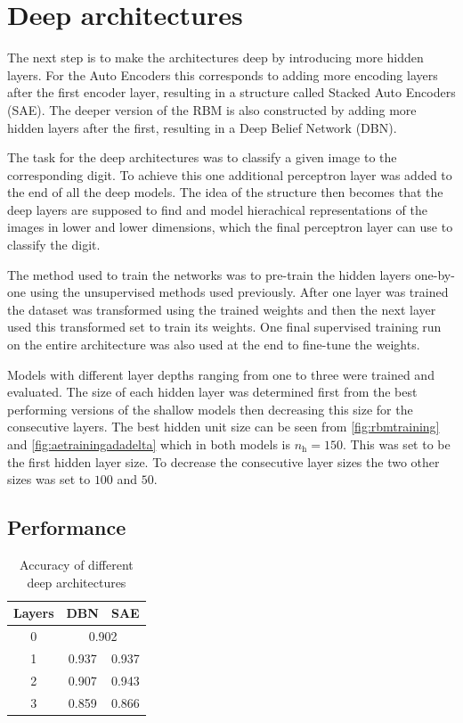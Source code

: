 \documentclass{article}
\begin{document}
\section{Deep architectures}
The next step is to make the architectures deep by introducing more hidden layers.
For the Auto Encoders this corresponds to adding more encoding layers after the first encoder layer,
resulting in a structure called Stacked Auto Encoders (SAE).
The deeper version of the RBM is also constructed by adding more hidden layers after the first,
resulting in a Deep Belief Network (DBN).

The task for the deep architectures was to classify a given image to the corresponding digit.
To achieve this one additional perceptron layer was added to the end of all the deep models.
The idea of the structure then becomes that the deep layers are supposed to find and model
hierachical representations of the images in lower and lower dimensions,
which the final perceptron layer can use to classify the digit.

The method used to train the networks was to pre-train the hidden layers one-by-one
using the unsupervised methods used previously.
After one layer was trained the dataset was transformed using the trained weights
and then the next layer used this transformed set to train its weights.
One final supervised training run on the entire architecture
was also used at the end to fine-tune the weights.

Models with different layer depths ranging from one to three were trained and evaluated.
The size of each hidden layer was determined first from the best performing versions 
of the shallow models then decreasing this size for the consecutive layers.
The best hidden unit size can be seen from  \cref{fig:rbmtraining} and \cref{fig:aetrainingadadelta}
which in both models is $n_{\text{h}} = 150$.
This was set to be the first hidden layer size.
To decrease the consecutive layer sizes the two other sizes was set to $100$ and $50$.

\subsection{Performance}

\begin{table}[!ht]
  \centering
  \caption{Accuracy of different deep architectures}
  \label{tab:accuracy}
  \begin{tabular}{ccc}
    Layers & DBN & SAE \\ \midrule
    0 & \multicolumn{2}{c}{0.902} \\
    1 & 0.937 & 0.937 \\
    2 & 0.907 & 0.943 \\
    3 & 0.859 & 0.866
  \end{tabular}
\end{table}
\end{document}
